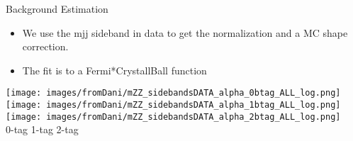 


\begin{frame}{Background Estimation}
  \scriptsize
  \begin{itemize}
  \item
    We use the mjj sideband in data to get the normalization and a MC shape correction.

\item
  The fit is to a Fermi*CrystallBall function
\end{itemize}

\begin{center}
    \texttt{[image: images/fromDani/mZZ\_sidebandsDATA\_alpha\_0btag\_ALL\_log.png]}
    \texttt{[image: images/fromDani/mZZ\_sidebandsDATA\_alpha\_1btag\_ALL\_log.png]}
    \texttt{[image: images/fromDani/mZZ\_sidebandsDATA\_alpha\_2btag\_ALL\_log.png]}\\
0-tag \hspace{10.5em} 1-tag \hspace{10.5em} 2-tag
\end{center}

\end{frame}
